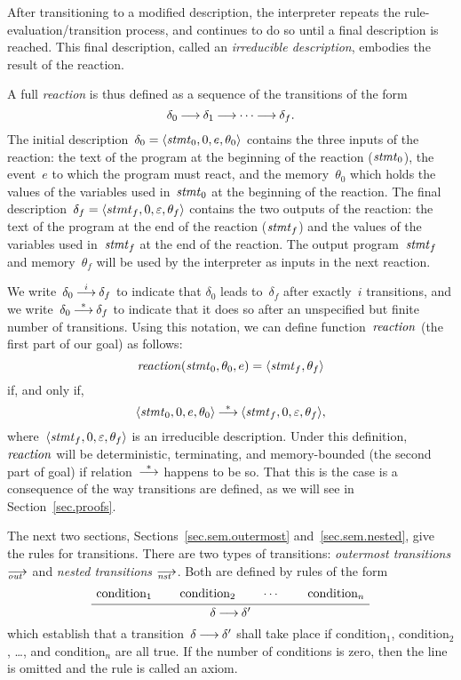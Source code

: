 After transitioning to a modified description, the interpreter repeats the
rule-evaluation/transition process, and continues to do so until a final
description is reached.  This final description, called an \emph{irreducible
  description}, embodies the result of the reaction.

A full \emph{reaction} is thus defined as a sequence of the transitions of
the form
\[
  \delta_0\trans\delta_1\trans\cdots\trans\delta_f.
\]
The initial description~$\delta_0=\<\stmt_0,0,e,\theta_0>$ contains the
three inputs of the reaction: the text of the program at the beginning of
the reaction ($\mathit{stmt}_0$), the event~$e$ to which the program must react, and
the memory~$\theta_0$ which holds the values of the variables used
in~$\mathit{stmt}_0$ at the beginning of the reaction.  The final
description~$\delta_f=\<stmt_f,0,\nil,\theta_f>$ contains the two outputs of
the reaction: the text of the program at the end of the reaction ($\mathit{stmt}_f$)
and the values of the variables used in~$\mathit{stmt}_f$ at the end of the
reaction.  The output program~$\mathit{stmt}_f$ and memory~$\theta_f$ will be used
by the interpreter as inputs in the next reaction.

We write~$\delta_0\trans[i]\delta_f$ to indicate that $\delta_0$ leads
to~$\delta_f$ after exactly~$i$ transitions, and we
write~$\delta_0\trans[*]\delta_f$ to indicate that it does so after an
unspecified but finite number of transitions.  Using this notation, we can
define function~$\mathop{\mathit{reaction}}$ (the first part of our goal) as follows:
\[
  \reaction(\stmt_0,\theta_0,e)=\<\stmt_f,\theta_f>
\]
if, and only if,
\[
  \<\stmt_0,0,e,\theta_0>\trans[*]\<\stmt_f,0,\nil,\theta_f>,
\]
where~$\<\stmt_f,0,\nil,\theta_f>$ is an irreducible description.  Under
this definition, $\mathop{\mathit{reaction}}$ will be deterministic, terminating, and
memory-bounded (the second part of goal) if relation~$\trans[*]$ happens to
be so.  That this is the case is a consequence of the way transitions are
defined, as we will see in Section~\ref{sec.proofs}.

The next two sections, Sections~\ref{sec.sem.outermost}
and~\ref{sec.sem.nested}, give the rules for transitions.  There are two
types of transitions: \emph{outermost transitions} $\out$ and \emph{nested
  transitions} $\nst$.  Both are defined by rules of the form
\[
  \AxiomC{\strut condition$_1$}
  \AxiomC{\strut condition$_2$}
  \AxiomC{$\cdots$}
  \AxiomC{\strut condition$_n$}
  \QuaternaryInfC{$\delta\trans\delta'$}
  \DisplayProof
\]
which establish that a transition~$\delta\trans\delta'$ shall take place if
condition$_1$, condition$_2$, \dots, and condition$_n$ are all true.  If the
number of conditions is zero, then the line is omitted and the rule is
called an axiom.


